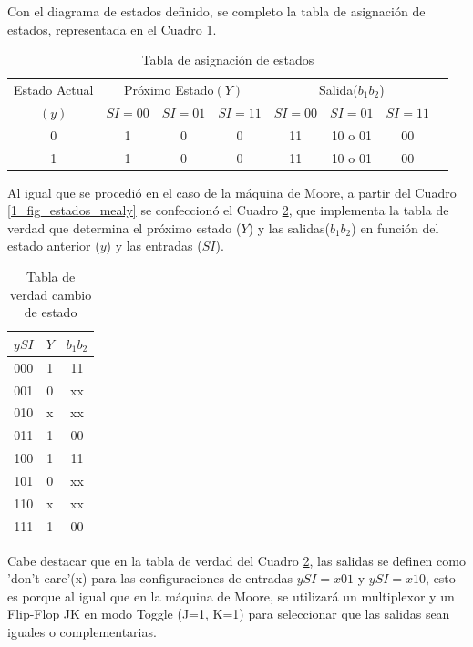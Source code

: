 Con el diagrama de estados definido, se completo la tabla de asignación de estados, representada en el Cuadro \ref{1_tabla_mealy_estados}.

\begin{table}[ht]
	\centering
	\begin{tabular}{c|c|c|c|c|c|c|c}
	Estado Actual & \multicolumn{3}{c|}{Próximo Estado$(Y)$} & \multicolumn{3}{c|}{Salida($b_1b_2$)}\\
	\cline{2-7}
	$(y)$ & $SI=00$ & $SI=01$ & $SI=11$ & $SI=00$ & $SI=01$ & $SI=11$ \\
	\hline
	0 & 1 & 0 & 0 & 11 & 10 o 01 & 00 \\
	1 & 1 & 0 & 0 & 11 & 10 o 01 & 00\\
	\end{tabular}
	\caption{Tabla de asignación de estados} \label{1_tabla_mealy_estados}
\end{table}

Al igual que se procedió en el caso de la máquina de Moore, a partir del Cuadro \ref{1_fig_estados_mealy} se confeccionó el Cuadro \ref{1_tabla_verdad_mealy}, que implementa la tabla de verdad que determina el próximo estado ($Y$) y las salidas($b_1b_2$) en función del estado anterior ($y$) y las entradas ($SI$). 

\begin{table}[H]
	\centering
	\begin{tabular}{c|c|c}
	$ySI$ & $Y$ & $b_1b_2$ \\ 
	\hline 
	000 & 1 & 11  \\ 
	\hline 
	001 & 0 & xx  \\ 
	\hline 
	010 & x & xx  \\ 
	\hline 
	011 & 1 & 00  \\ 
	\hline 
	100 & 1 & 11  \\ 
	\hline 
	101 & 0 & xx  \\ 
	\hline 
	110 & x & xx  \\ 
	\hline 
	111 & 1 & 00  \\ 
	\end{tabular} 
	\caption{Tabla de verdad cambio de estado} \label{1_tabla_verdad_mealy}
\end{table}

Cabe destacar que en la tabla de verdad del Cuadro \ref{1_tabla_verdad_mealy}, las salidas se definen como 'don't care'(x) para las configuraciones de entradas $ySI = x01$ y $ySI = x10$, esto es porque al igual que en la máquina de Moore, se utilizará un multiplexor y un Flip-Flop JK en modo Toggle (J=1, K=1) para seleccionar que las salidas sean iguales o complementarias.

